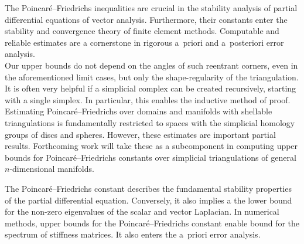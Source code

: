 \documentclass[a4paper]{article}
\begin{document}


\color{blue}

The Poincar\'e--Friedrichs inequalities are crucial in the stability analysis of partial differential equations of vector analysis. Furthermore, their constants enter the stability and convergence theory of finite element methods. Computable and reliable estimates are a cornerstone in rigorous a~priori and a~posteriori error analysis. 
\\

\color{red}Our upper bounds do not depend on the angles of such reentrant corners, even in the aforementioned limit cases, but only the shape-regularity of the triangulation. \color{black}
\\

It is often very helpful if a simplicial complex can be created recursively, starting with a single simplex. 
In particular, this enables the inductive method of proof.
\\

Estimating Poincar\'e--Friedrichs over domains and manifolds with shellable triangulations is fundamentally restricted to spaces with the simplicial homology groups of discs and spheres. However, these estimates are important partial results. Forthcoming work will take these as a subcomponent in computing upper bounds for Poincar\'e--Friedrichs constants over simplicial triangulations of general $n$-dimensional manifolds. 

\begin{remark}
    The Poincar\'e--Friedrichs constant describes the fundamental stability properties of the partial differential equation. 
    Conversely, it also implies a the lower bound for the non-zero eigenvalues of the scalar and vector Laplacian.
    In numerical methods, upper bounds for the Poincar\'e--Friedrichs constant enable bound for the spectrum of stiffness matrices. 
    It also enters the a~priori error analysis. 
\end{remark}
\end{document}
